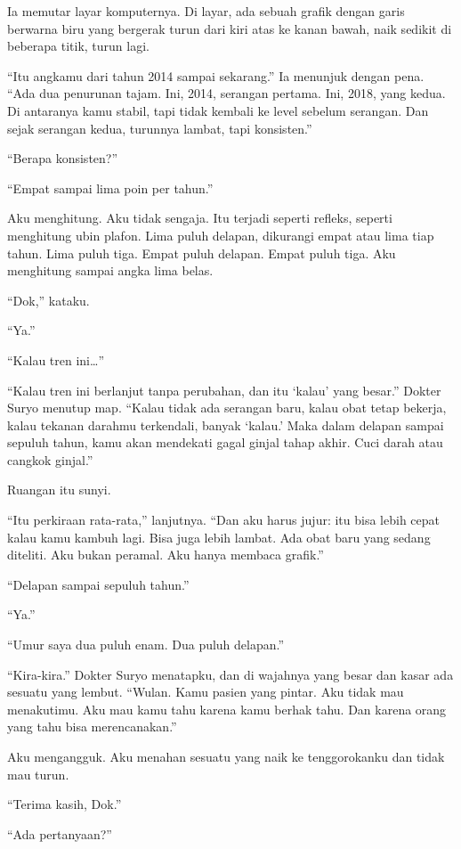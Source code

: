 \documentclass[11pt,twoside,openany]{book}
\begin{document}
Ia memutar layar komputernya. Di layar, ada sebuah grafik dengan garis berwarna biru yang bergerak turun dari kiri atas ke kanan bawah, naik sedikit di beberapa titik, turun lagi.

``Itu angkamu dari tahun 2014 sampai sekarang.'' Ia menunjuk dengan pena. ``Ada dua penurunan tajam. Ini, 2014, serangan pertama. Ini, 2018, yang kedua. Di antaranya kamu stabil, tapi tidak kembali ke level sebelum serangan. Dan sejak serangan kedua, turunnya lambat, tapi konsisten.''

``Berapa konsisten?''

``Empat sampai lima poin per tahun.''

Aku menghitung. Aku tidak sengaja. Itu terjadi seperti refleks, seperti menghitung ubin plafon. Lima puluh delapan, dikurangi empat atau lima tiap tahun. Lima puluh tiga. Empat puluh delapan. Empat puluh tiga. Aku menghitung sampai angka lima belas.

``Dok,'' kataku.

``Ya.''

``Kalau tren ini\ldots{}''

``Kalau tren ini berlanjut tanpa perubahan, dan itu `kalau' yang besar.'' Dokter Suryo menutup map. ``Kalau tidak ada serangan baru, kalau obat tetap bekerja, kalau tekanan darahmu terkendali, banyak `kalau.' Maka dalam delapan sampai sepuluh tahun, kamu akan mendekati gagal ginjal tahap akhir. Cuci darah atau cangkok ginjal.''

Ruangan itu sunyi.

``Itu perkiraan rata-rata,'' lanjutnya. ``Dan aku harus jujur: itu bisa lebih cepat kalau kamu kambuh lagi. Bisa juga lebih lambat. Ada obat baru yang sedang diteliti. Aku bukan peramal. Aku hanya membaca grafik.''

``Delapan sampai sepuluh tahun.''

``Ya.''

``Umur saya dua puluh enam. Dua puluh delapan.''

``Kira-kira.'' Dokter Suryo menatapku, dan di wajahnya yang besar dan kasar ada sesuatu yang lembut. ``Wulan. Kamu pasien yang pintar. Aku tidak mau menakutimu. Aku mau kamu tahu karena kamu berhak tahu. Dan karena orang yang tahu bisa merencanakan.''

Aku mengangguk. Aku menahan sesuatu yang naik ke tenggorokanku dan tidak mau turun.

``Terima kasih, Dok.''

``Ada pertanyaan?''
\end{document}
